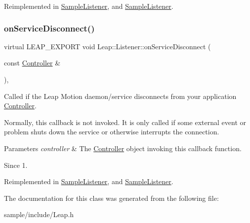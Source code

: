 Reimplemented in \hyperlink{class_sample_listener_a498412bdb417e605587ce25e836ff793}{Sample\+Listener}, and \hyperlink{class_sample_listener_a52b985b9f9a2db11b99fba2af3c3b6a6}{Sample\+Listener}.

\mbox{\label{class_leap_1_1_listener_a894976a7ff7a101a08c9b88a43ec367b}} 
\subsubsection{\texorpdfstring{on\+Service\+Disconnect()}{onServiceDisconnect()}}
{\footnotesize\ttfamily virtual L\+E\+A\+P\+\_\+\+E\+X\+P\+O\+RT void Leap\+::\+Listener\+::on\+Service\+Disconnect (\begin{DoxyParamCaption}\item[{const \hyperlink{class_leap_1_1_controller}{Controller} \&}]{ }\end{DoxyParamCaption})\hspace{0.3cm}{\ttfamily [inline]}, {\ttfamily [virtual]}}

Called if the Leap Motion daemon/service disconnects from your application \hyperlink{class_leap_1_1_controller}{Controller}.

Normally, this callback is not invoked. It is only called if some external event or problem shuts down the service or otherwise interrupts the connection.


\begin{DoxyCodeInclude}
\end{DoxyCodeInclude}



\begin{DoxyParams}{Parameters}
{\em controller} & The \hyperlink{class_leap_1_1_controller}{Controller} object invoking this callback function. \\
\hline
\end{DoxyParams}
\begin{DoxySince}{Since}
1. 
\end{DoxySince}


Reimplemented in \hyperlink{class_sample_listener_afb2cf676f82cb7df58052085ecc64dd1}{Sample\+Listener}, and \hyperlink{class_sample_listener_a60f017a145fbad1dd41b1d171a7a8c69}{Sample\+Listener}.



The documentation for this class was generated from the following file\+:\begin{DoxyCompactItemize}
\item 
sample/include/Leap.\+h\end{DoxyCompactItemize}
